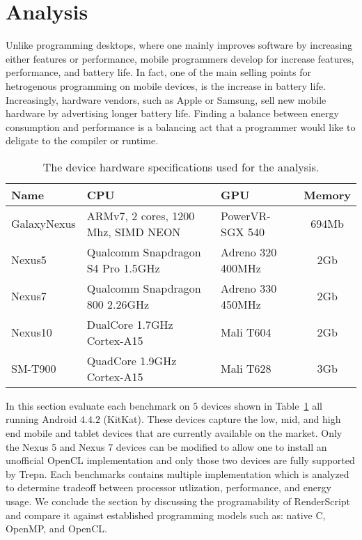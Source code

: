 \section{Analysis}
\label{sec:analysis}

Unlike programming desktops, where one mainly 
  improves software by increasing either features or performance,
  mobile programmers develop for increase features, performance, and 
  battery life.
In fact, one of the main selling points for hetrogenous
  programming on mobile devices, is the increase in battery life.
Increasingly, hardware vendors, such as Apple or Samsung, sell new
  mobile hardware by advertising longer battery life.
Finding a balance between energy consumption and performance is a 
  balancing act that a programmer would like to deligate to the 
  compiler or runtime.


\begin{table}[h]\small
\centering
\begin{tabular}{ | l | p{2.3cm} | p{1.7cm} | c |}
    \hline 
    Name & CPU & GPU & Memory \\ \hline
    GalaxyNexus & ARMv7, 2 cores, 1200 Mhz, SIMD NEON & PowerVR-SGX 540 & 694Mb \\ \hline
    Nexus5 & Qualcomm Snapdragon S4 Pro 1.5GHz & Adreno 320 400MHz & 2Gb \\ \hline
    Nexus7 & Qualcomm Snapdragon 800 2.26GHz & Adreno 330 450MHz & 2Gb \\ \hline
    Nexus10 & DualCore 1.7GHz Cortex-A15 & Mali T604 & 2Gb \\ \hline
    SM-T900 & QuadCore 1.9GHz Cortex-A15 & Mali T628 & 3Gb \\ \hline
    \hline
\end{tabular}
\caption{The device hardware specifications used for the analysis.}
\label{table:hardware}
\end{table}

In this section evaluate each benchmark on $5$ devices shown
  in Table~\ref{table:hardware} all running Android $4.4.2$ (KitKat).
These devices capture the low, mid, and high end mobile and tablet
  devices that are currently available on the market.
Only the Nexus 5 and Nexus 7 devices can be modified to allow one to install an
  unofficial OpenCL implementation and only those two devices are fully supported
  by Trepn.
Each benchmarks contains multiple implementation which 
  is analyzed to determine tradeoff between
  processor utlization, performance, and energy usage.
We conclude the section by discussing the programability of RenderScript
  and compare it against established programming models such as:
  native C, OpenMP, and OpenCL.






